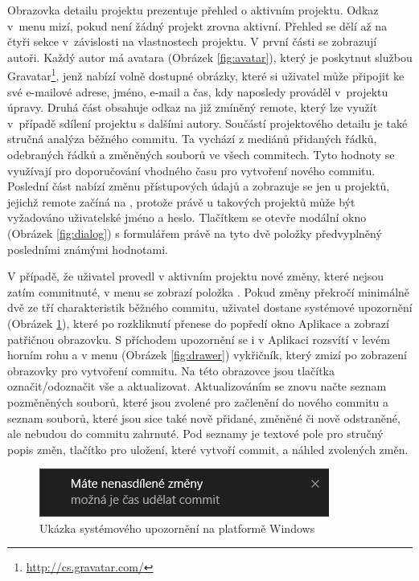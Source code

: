 Obrazovka detailu projektu prezentuje přehled o aktivním projektu. Odkaz v~menu mizí, pokud není žádný projekt zrovna aktivní. Přehled se dělí až na čtyři sekce v~závislosti na vlastnostech projektu. V první části se zobrazují autoři. Každý autor má avatara (Obrázek \ref{fig:avatar}), který je poskytnut službou Gravatar\footnote{\url{http://cs.gravatar.com/}}, jenž nabízí volně dostupné obrázky, které si uživatel může připojit ke své e-mailové adrese, jméno, e-mail a čas, kdy naposledy prováděl v~projektu úpravy. Druhá část obsahuje odkaz na již zmíněný remote, který lze využít v~případě sdílení projektu s dalšími autory. Součástí projektového detailu je také stručná analýza běžného commitu. Ta vychází z mediánů přidaných řádků, odebraných řádků a změněných souborů ve všech commitech. Tyto hodnoty se využívají pro doporučování vhodného času pro vytvoření nového commitu. Poslední část nabízí změnu přístupových údajů a zobrazuje se jen u projektů, jejichž remote začíná na , protože právě u takových projektů může být vyžadováno uživatelské jméno a heslo. Tlačítkem  se otevře modální okno (Obrázek \ref{fig:dialog}) s formulářem právě na tyto dvě položky předvyplněný posledními známými hodnotami.

V případě, že uživatel provedl v aktivním projektu nové změny, které nejsou zatím commitnuté, v menu se zobrazí položka . Pokud změny překročí minimálně dvě ze tří charakteristik běžného commitu, uživatel dostane systémové upozornění (Obrázek \ref{fig:notification}), které po rozkliknutí přenese do popředí okno Aplikace a zobrazí patřičnou obrazovku. S příchodem upozornění se i v Aplikaci rozsvítí v levém horním rohu a v menu (Obrázek \ref{fig:drawer}) vykřičník, který zmizí po zobrazení obrazovky pro vytvoření commitu. Na této obrazovce jsou tlačítka označit/odoznačit vše a aktualizovat. Aktualizováním se znovu načte seznam pozměněných souborů, které jsou zvolené pro začlenění do nového commitu a seznam souborů, které jsou sice také nově přidané, změněné či nově odstraněné, ale nebudou do commitu zahrnuté. Pod seznamy je textové pole pro stručný popis změn, tlačítko pro uložení, které vytvoří commit, a náhled zvolených změn.

\FloatBarrier
\begin{figure}[ht]
	\centering
	\includegraphics[scale=0.65]{sections/ui/images/notification.png}
	\caption[Systémové upozornění]{Ukázka systémového upozornění na platformě Windows}
	\label{fig:notification}
\end{figure}
\FloatBarrier

